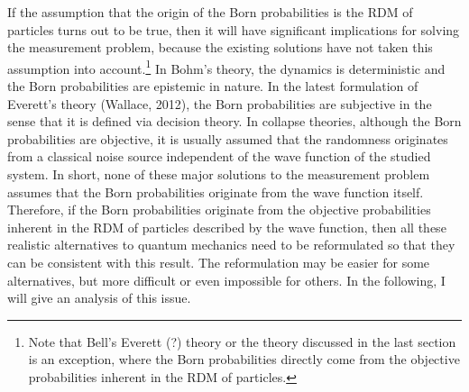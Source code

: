 If the assumption that the origin of the Born probabilities is the RDM of particles turns out to be true, then it will have significant implications for solving the measurement problem, because the existing solutions have not taken this assumption into account.\footnote{Note that Bell's Everett (?) theory or the theory discussed in the last section is an exception, where the Born probabilities directly come from the objective probabilities inherent in the RDM of particles.}
In Bohm's theory, the dynamics is deterministic and the Born probabilities are epistemic in nature. 
In the latest formulation of Everett's theory (Wallace, 2012), the Born probabilities are subjective in the sense that it is defined via decision theory.
In collapse theories, although the Born probabilities are objective, it is usually assumed that the randomness originates from a classical noise source independent of the wave function of the studied system. 
In short, none of these major solutions to the measurement problem assumes that the Born probabilities originate from the wave function itself. 
Therefore, if the Born probabilities originate from the objective probabilities inherent in the RDM of particles described by the wave function, then all these realistic alternatives to  quantum mechanics need to be reformulated so that they can be consistent with this result. 
The reformulation may be easier for some alternatives, but  more difficult or even impossible for others. In the following, I will give an analysis of this issue.

